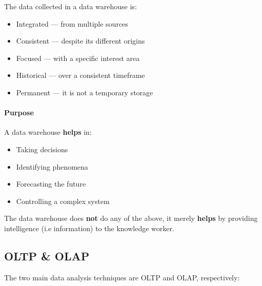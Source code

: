 \documentclass[openright, twoside, twocolumn, a4paper, 10pt]{report}
\begin{document}
The data collected in a data warehouse is:

\begin{itemize}
	\item Integrated --- from multiple sources
	\item Consistent --- despite its different origins
	\item Focused --- with a specific interest area
	\item Historical --- over a consistent timeframe
	\item Permanent --- it is not a temporary storage
\end{itemize}

\paragraph{Purpose}
A data warehouse \textbf{helps} in:

\begin{itemize}
	\item Taking decisions
	\item Identifying phenomena
	\item Forecasting the future
	\item Controlling a complex system
\end{itemize}

\begin{remark}
	The data warehouse does \textbf{not} do any of the above, it merely
	\textbf{helps} by providing intelligence (i.e information) to the
	knowledge worker.
\end{remark}

\subsection{OLTP \& OLAP}

The two main data analysis techniques are OLTP and OLAP, respectively:
\end{document}

